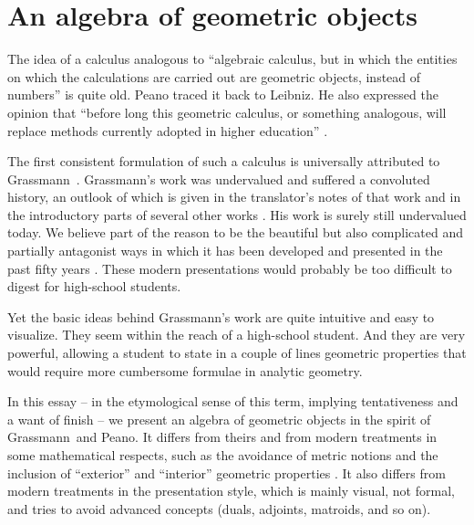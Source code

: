 \documentclass[\ifafour a4paper,12pt,\else a5paper,10pt,\fi%
onecolumn,oneside,article,%
british%
]{memoir}
\theoremstyle{remark}
\theoremstyle{innote}
\newcommand*{\citep}{\parencites}
\newcommand*{\citey}{\parencites*}
\renewcommand*{\|}{\nonscript\,\vert\nonscript\;\mathopen{}}
\newcommand*{\chap}{ch.}%
\newcommand*{\gm}{Grassmann}
\newcommand*{\+}{\boxplus}
\begin{document}
\section{An algebra of geometric objects}
\label{sec:algebra_geometry}

The idea of a calculus analogous to \enquote{algebraic calculus, but in
  which the entities on which the calculations are carried out are
  geometric objects, instead of numbers} \citep[\chap~I, our
transl.]{peano1888} is quite old. Peano traced it back to Leibniz. He also
expressed the opinion that \enquote{before long this geometric calculus, or
  something analogous, will replace methods currently adopted in higher
  education} \citep[Prefazione, our transl.]{peano1888}.

The first consistent formulation of such a calculus is universally
attributed to \gm\ \citey{grassmann1844_r1878,grassmann1862}. Grassmann's
work was undervalued and suffered a convoluted history, an outlook of which
is given in the translator's notes of that work
\citep{grassmann1844_t1995,grassmann1862_t2000} and in the introductory
parts of several other works
\citep{peano1888,barnabeietal1985,crapo2009,browne2012,vargas2016}. His
work is surely still undervalued today. We believe part of the reason to be
the beautiful but also complicated and partially antagonist ways in which
it has been developed and presented in the past fifty years \citep[examples
are][]{hestenes1968,hestenesetal1984_r1987,barnabeietal1985,dorstetal2002,li2008,crapo2009,brinietal2011,dorstetal2011,gunn2011,browne2012,gonzalezcalvet2016,vargas2016}.
These modern presentations would probably be too difficult to digest for
high-school students.

Yet the basic ideas behind Grassmann's work are quite intuitive and easy to
visualize. They seem within the reach of a high-school student. And they
are very powerful, allowing a student to state in a couple of lines
geometric properties that would require more cumbersome formulae in
analytic geometry.


In this essay -- in the etymological sense of this term, implying
tentativeness and a want of finish -- we present an algebra of geometric
objects in the spirit of \gm\ and Peano. It differs from theirs and from
modern treatments in some mathematical respects, such as the avoidance of
metric notions and the inclusion of \enquote{exterior} and
\enquote{interior} geometric properties
\citep{veblenetal1932,schoutenetal1940,schouten1951_r1989,burke1983,burke1985_r1987,burke1995,bossavit1994_r2002,bossavit2003b}.
It also differs from modern treatments in the presentation style, which is
mainly visual, not formal, and tries to avoid advanced concepts (duals,
adjoints, matroids, and so on).
\end{document}

